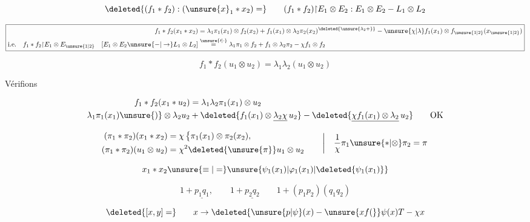 
\[
\deleted{(f_1\ast f_2):(\unsure{x}_1\ast x_2)=}
\qquad (f_1\ast f_2)\mathord{\upharpoonright} E_1\otimes E_2:
 E_1\otimes E_2 - L_1\otimes L_2
\]

\[
\boxed{\begin{aligned}
 f_1\ast f_2(x_1\ast x_2)&=\lambda_1\pi_1(x_1)\otimes f_2(x_2)
 + f_1(x_1)\otimes\lambda_2\pi_2(x_2)^{\deleted{\unsure{\lambda_2+}}}
 -\unsure{\chi|\lambda}f_1(x_1)\otimes f_{\unsure{1|2}}(x_{\unsure{1|2}})\\
 \text{i.e.}\quad f_1\ast f_2\mathord{\upharpoonright} E_1\otimes E_{\unsure{1|2}}\quad
 [E_1\otimes E_2\unsure{-|\to} L_1\otimes L_2]&\overset{\unsure{\prime|\cdot}}{=}\lambda_1\pi_1\otimes f_2+
 f_1\otimes\lambda_2\pi_2-\chi f_1\otimes f_2
\end{aligned}}
\]

\[
 f_1\ast f_2(u_1\otimes u_2)=\lambda_1\lambda_2(u_1\otimes u_2)
\]

\qquad Vérifions

\[
\begin{aligned}
 f_1\ast f_2(x_1\ast u_2)&=\lambda_1\lambda_2\pi_1(x_1)\otimes u_2\\
 \lambda_1\pi_1(x_1)\unsure{)}\otimes\lambda_2 u_2
 &+\deleted{f_1(x_1)\otimes\underline{\lambda_2\chi}\,u_2}
 -\deleted{\underline{\chi f_1(x_1)\otimes\lambda_2}\,u_2}\qquad\text{OK}
\end{aligned}
\]

\[
\begin{aligned}
(\pi_1\ast\pi_2)(x_1\ast x_2)&=\chi\,\big\{\pi_1(x_1)\otimes\pi_2(x_2),\\
(\pi_1\ast\pi_2)(u_1\otimes u_2)&=\chi^2\deleted{\unsure{\pi}}u_1\otimes u_2
\end{aligned}
\qquad\left|\quad \frac1\chi\pi_1\unsure{\ast|\otimes}\pi_2=\pi\right.
\]

\[
 x_1\ast x_2\unsure{\equiv|=}\unsure{\psi_1(x_1)|\varphi_1(x_1)|\deleted{\psi_1(x_1)}}
\]


\[
 1+\underline{p_1q_1},\qquad 1+\underline{p_2q_2}\qquad 1+(p_1p_2)(q_1q_2)
\]

\[
 \deleted{[x,y]=}\qquad x\to\deleted{\unsure{p|\psi}(x)-\unsure{xf(}}\psi(x)T-\chi x
\]

